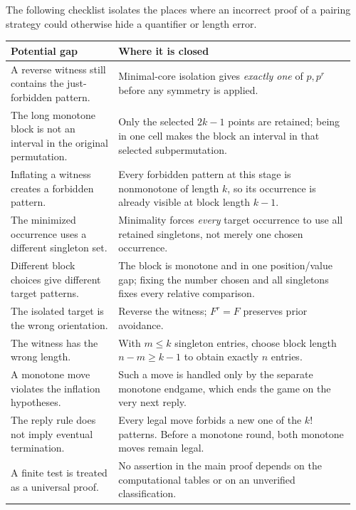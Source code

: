 \documentclass[11pt,a4paper]{article}
\theoremstyle{definition}
\theoremstyle{remark}
\begin{document}
The following checklist isolates the places where an incorrect proof of a
pairing strategy could otherwise hide a quantifier or length error.

\begin{longtable}{@{}p{0.30\linewidth}p{0.66\linewidth}@{}}
\toprule
\textbf{Potential gap} & \textbf{Where it is closed}\\
\midrule
\endhead
A reverse witness still contains the just-forbidden pattern.
& Minimal-core isolation gives \emph{exactly one} of $p,p^r$ before any
symmetry is applied.\\[0.4em]
The long monotone block is not an interval in the original permutation.
& Only the selected $2k-1$ points are retained; being in one cell makes the
block an interval in that selected subpermutation.\\[0.4em]
Inflating a witness creates a forbidden pattern.
& Every forbidden pattern at this stage is nonmonotone of length $k$, so its
occurrence is already visible at block length $k-1$.\\[0.4em]
The minimized occurrence uses a different singleton set.
& Minimality forces \emph{every} target occurrence to use all retained
singletons, not merely one chosen occurrence.\\[0.4em]
Different block choices give different target patterns.
& The block is monotone and in one position/value gap; fixing the number
chosen and all singletons fixes every relative comparison.\\[0.4em]
The isolated target is the wrong orientation.
& Reverse the witness; $F^r=F$ preserves prior avoidance.\\[0.4em]
The witness has the wrong length.
& With $m\le k$ singleton entries, choose block length $n-m\ge k-1$ to obtain
exactly $n$ entries.\\[0.4em]
A monotone move violates the inflation hypotheses.
& Such a move is handled only by the separate monotone endgame, which ends
the game on the very next reply.\\[0.4em]
The reply rule does not imply eventual termination.
& Every legal move forbids a new one of the $k!$ patterns. Before a monotone
round, both monotone moves remain legal.\\[0.4em]
A finite test is treated as a universal proof.
& No assertion in the main proof depends on the computational tables or on
an unverified classification.\\
\bottomrule
\end{longtable}
\end{document}
